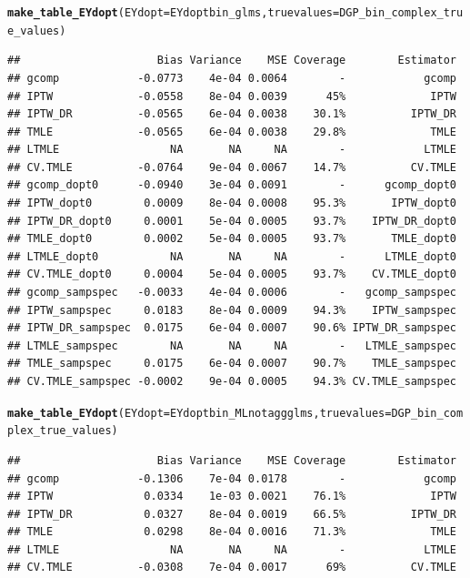 \documentclass[11pt]{article}\usepackage[]{graphicx}\usepackage[]{color}
\makeatletter
\newcommand{\hlstd}[1]{\textcolor[rgb]{0.345,0.345,0.345}{#1}}%
\newcommand{\hlkwc}[1]{\textcolor[rgb]{0.333,0.667,0.333}{#1}}%
\newcommand{\hlkwd}[1]{\textcolor[rgb]{0.737,0.353,0.396}{\textbf{#1}}}%
\newenvironment{kframe}{%
 \def\at@end@of@kframe{}%
 \ifinner\ifhmode%
  \def\at@end@of@kframe{\end{minipage}}%
  \begin{minipage}{\columnwidth}%
 \fi\fi%
 \def\FrameCommand##1{\hskip\@totalleftmargin \hskip-\fboxsep
 \colorbox{shadecolor}{##1}\hskip-\fboxsep
     \hskip-\linewidth \hskip-\@totalleftmargin \hskip\columnwidth}%
 \MakeFramed {\advance\hsize-\width
   \@totalleftmargin\z@ \linewidth\hsize
   \@setminipage}}%
 {\par\unskip\endMakeFramed%
 \at@end@of@kframe}
\newenvironment{knitrout}{}{} %
\makeatother
\begin{document}
\begin{knitrout}
\color{fgcolor}\begin{kframe}
\begin{alltt}
\hlkwd{make_table_EYdopt}\hlstd{(}\hlkwc{EYdopt} \hlstd{= EYdoptbin_glms,} \hlkwc{truevalues} \hlstd{= DGP_bin_complex_true_values)}
\end{alltt}
\begin{verbatim}
##                     Bias Variance    MSE Coverage        Estimator
## gcomp            -0.0773    4e-04 0.0064        -            gcomp
## IPTW             -0.0558    8e-04 0.0039      45%             IPTW
## IPTW_DR          -0.0565    6e-04 0.0038    30.1%          IPTW_DR
## TMLE             -0.0565    6e-04 0.0038    29.8%             TMLE
## LTMLE                 NA       NA     NA        -            LTMLE
## CV.TMLE          -0.0764    9e-04 0.0067    14.7%          CV.TMLE
## gcomp_dopt0      -0.0940    3e-04 0.0091        -      gcomp_dopt0
## IPTW_dopt0        0.0009    8e-04 0.0008    95.3%       IPTW_dopt0
## IPTW_DR_dopt0     0.0001    5e-04 0.0005    93.7%    IPTW_DR_dopt0
## TMLE_dopt0        0.0002    5e-04 0.0005    93.7%       TMLE_dopt0
## LTMLE_dopt0           NA       NA     NA        -      LTMLE_dopt0
## CV.TMLE_dopt0     0.0004    5e-04 0.0005    93.7%    CV.TMLE_dopt0
## gcomp_sampspec   -0.0033    4e-04 0.0006        -   gcomp_sampspec
## IPTW_sampspec     0.0183    8e-04 0.0009    94.3%    IPTW_sampspec
## IPTW_DR_sampspec  0.0175    6e-04 0.0007    90.6% IPTW_DR_sampspec
## LTMLE_sampspec        NA       NA     NA        -   LTMLE_sampspec
## TMLE_sampspec     0.0175    6e-04 0.0007    90.7%    TMLE_sampspec
## CV.TMLE_sampspec -0.0002    9e-04 0.0005    94.3% CV.TMLE_sampspec
\end{verbatim}
\begin{alltt}
\hlkwd{make_table_EYdopt}\hlstd{(}\hlkwc{EYdopt} \hlstd{= EYdoptbin_MLnotaggglms,} \hlkwc{truevalues} \hlstd{= DGP_bin_complex_true_values)}
\end{alltt}
\begin{verbatim}
##                     Bias Variance    MSE Coverage        Estimator
## gcomp            -0.1306    7e-04 0.0178        -            gcomp
## IPTW              0.0334    1e-03 0.0021    76.1%             IPTW
## IPTW_DR           0.0327    8e-04 0.0019    66.5%          IPTW_DR
## TMLE              0.0298    8e-04 0.0016    71.3%             TMLE
## LTMLE                 NA       NA     NA        -            LTMLE
## CV.TMLE          -0.0308    7e-04 0.0017      69%          CV.TMLE

\end{verbatim}
\end{kframe}
\end{knitrout}
\end{document}

